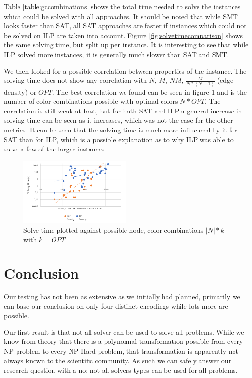 \documentclass{sig-alternate}
\begin{document}
Table \ref{table:gccombinations} shows the total time needed to solve the instances which could be solved with all approaches.
It should be noted that while SMT looks faster than SAT, all SAT approaches are faster if instances which could not be solved on ILP are taken into account.
Figure \ref{fig:solvetimecomparison} shows the same solving time, but split up per instance.
It is interesting to see that while ILP solved more instances, it is generally much slower than SAT and SMT.

We then looked for a possible correlation between properties of the instance.
The solving time does not show any correlation with $N$, $M$, $N M$, $\frac{M}{N*(N-1)}$ (edge density) or $OPT$.
The best correlation we found can be seen in figure \ref{fig:nodecolorcombinations} and is the number of color combinations possible with optimal colors $N * OPT$.
The correlation is still weak at best, but for both SAT and ILP a general increase in solving time can be seen as it increases, which was not the case for the other metrics.
It can be seen that the solving time is much more influenced by it for SAT than for ILP, which is a possible explanation as to why ILP was able to solve a few of the larger instances.

\begin{figure}
  \includegraphics[width=0.5\textwidth]{figures/nodecolor_combinations_in_opt}
  \caption{Solve time plotted against possible node, color combinations $|N|*k$ with $k=OPT$}
  \label{fig:nodecolorcombinations}
\end{figure}

\section{Conclusion}

Our testing has not been as extensive as we initially had planned, primarily we can base our conclusion on only four distinct encodings while lots more are possible.

Our first result is that not all solver can be used to solve all problems.
While we know from theory that there is a polynomial transformation possible from every NP problem to every NP-Hard problem, that transformation is apparently not always known to the scientific community.
As such we can safely answer our research question with a no: not all solvers types can be used for all problems.
\end{document}
